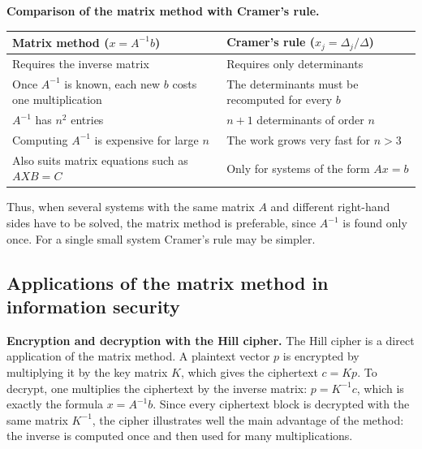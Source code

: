 \textbf{Comparison of the matrix method with Cramer’s rule.}

\begin{center}
\begin{tabular}{|p{5.3cm}|p{4.3cm}|}
\hline
\textbf{Matrix method ($x=A^{-1}b$)} & \textbf{Cramer’s rule ($x_j=\Delta_j/\Delta$)} \\
\hline
Requires the inverse matrix &
Requires only determinants \\
\hline
Once $A^{-1}$ is known, each new $b$ costs one multiplication &
The determinants must be recomputed for every $b$ \\
\hline
$A^{-1}$ has $n^2$ entries &
$n+1$ determinants of order $n$ \\
\hline
Computing $A^{-1}$ is expensive for large $n$ &
The work grows very fast for $n>3$ \\
\hline
Also suits matrix equations such as $AXB=C$ &
Only for systems of the form $Ax=b$ \\
\hline
\end{tabular}
\end{center}

Thus, when several systems with the same matrix $A$ and different right-hand
sides have to be solved, the matrix method is preferable, since $A^{-1}$ is
found only once. For a single small system Cramer’s rule may be simpler.

\subsection{Applications of the matrix method in information security}

\textbf{Encryption and decryption with the Hill cipher.}
The Hill cipher is a direct application of the matrix method. A plaintext
vector $p$ is encrypted by multiplying it by the key matrix $K$, which gives
the ciphertext $c = Kp$. To decrypt, one multiplies the ciphertext by the
inverse matrix: $p = K^{-1}c$, which is exactly the formula $x=A^{-1}b$.
Since every ciphertext block is decrypted with the same matrix $K^{-1}$, the
cipher illustrates well the main advantage of the method: the inverse is
computed once and then used for many multiplications.

